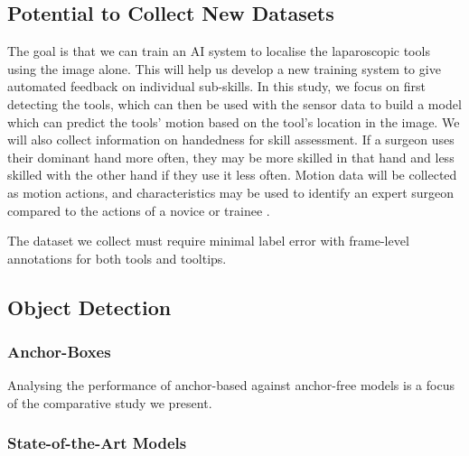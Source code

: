 \subsection{Potential to Collect New Datasets}

The goal is that we can train an AI system to localise the laparoscopic tools using the image alone. This will help us develop a new training system to give automated feedback on individual sub-skills. In this study, we focus on first detecting the tools, which can then be used with the sensor data to build a model which can predict the tools' motion based on the tool's location in the image. We will also collect information on handedness for skill assessment. If a surgeon uses their dominant hand more often, they may be more skilled in that hand and less skilled with the other hand if they use it less often. Motion data will be collected as motion actions, and characteristics may be used to identify an expert surgeon compared to the actions of a novice or trainee \cite{jones_analysis_2018}.




The dataset we collect must require minimal label error with frame-level annotations for both tools and tooltips.

\subsection{Object Detection}

\subsubsection{Anchor-Boxes}

Analysing the performance of anchor-based against anchor-free models is a focus of the comparative study we present.

\subsubsection{State-of-the-Art Models}

